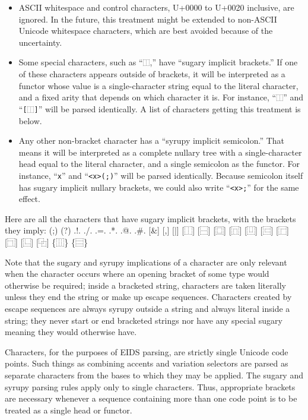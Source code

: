 \documentclass[twocolumn]{report}
\begin{document}
\begin{itemize}
  \item ASCII whitespace and control characters, U+0000 to U+0020 inclusive,
    are ignored.  In the future, this treatment might be extended to
    non-ASCII Unicode whitespace characters, which are best avoided because
    of the uncertainty.
  \item Some special characters, such as ``\texttt{⿰},'' have ``sugary
    implicit brackets.''  If one of these characters appears outside of
    brackets, it will be interpreted as a functor whose value is a
    single-character string equal to the literal character, and a fixed
    arity that depends on which character it is.  For instance,
    ``\texttt{⿰}'' and ``\texttt{[⿰]}'' will be parsed identically.
    A list of characters getting this treatment is below.
  \item Any other non-bracket character has a ``syrupy implicit semicolon.''
    That means it will be interpreted as a complete nullary tree with
    a single-character head equal to the literal character, and a
    single semicolon as the functor.  For instance, ``\texttt{x}'' and
    ``\texttt{<x>(;)}'' will be parsed identically.  Because semicolon
    itself has sugary implicit nullary brackets, we could also write
    ``\texttt{<x>;}'' for the same effect.
\end{itemize}

Here are all the characters that have sugary implicit brackets, with the
brackets they imply:  {\ttfamily (;) (?) .!. ./. .=. .*. .@. .\#. [\&] [,]
[|] [⿰] [⿱] [⿴] [⿵] [⿶] [⿷] [⿸] [⿹] [⿺] [⿻] \{⿲\} \{⿳\}}

Note that the sugary and syrupy implications of a character are only
relevant when the character occurs where an opening bracket of some type
would otherwise be required; inside a bracketed string, characters are taken
literally unless they end the string or make up escape sequences. 
Characters created by escape sequences are always syrupy outside a
string and always literal inside a string; they never start or end bracketed
strings nor have any special sugary meaning they would otherwise have.

Characters, for the purposes of EIDS parsing, are strictly single Unicode
code points.
Such things as combining accents and variation selectors are parsed as
separate characters from the bases to which they may be applied.
The sugary and syrupy parsing rules apply only to single characters.
Thus, appropriate brackets are necessary whenever a sequence containing
more than one code point is to be treated as a single head or functor.
\end{document}

